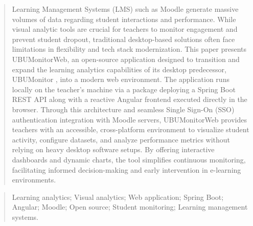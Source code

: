 \documentclass[a4paper,12pt,twoside]{memoir}
\begin{document}
\renewcommand*\abstractname{Abstract}
\begin{abstract}
Learning Management Systems (LMS) such as Moodle generate massive volumes of data regarding student interactions and performance. While visual analytic tools are crucial for teachers to monitor engagement and prevent student dropout, traditional desktop-based solutions often face limitations in flexibility and tech stack modernization. This paper presents UBUMonitorWeb, an open-source application designed to transition and expand the learning analytics capabilities of its desktop predecessor, UBUMonitor \cite{ubumonitor}, into a modern web environment. The application runs locally on the teacher's machine via a package deploying a Spring Boot REST API along with a reactive Angular frontend executed directly in the browser. Through this architecture and seamless Single Sign-On (SSO) authentication integration with Moodle servers, UBUMonitorWeb provides teachers with an accessible, cross-platform environment to visualize student activity, configure datasets, and analyze performance metrics without relying on heavy desktop software setups. By offering interactive dashboards and dynamic charts, the tool simplifies continuous monitoring, facilitating informed decision-making and early intervention in e-learning environments.
\end{abstract}

\renewcommand*\abstractname{Keywords}
\begin{abstract}
Learning analytics; Visual analytics; Web application; Spring Boot; Angular; Moodle; Open source; Student monitoring; Learning management systems.
\end{abstract}

\clearpage

\tableofcontents

\clearpage

\listoffigures

\clearpage

\listoftables
\clearpage

\mainmatter











\end{document}
